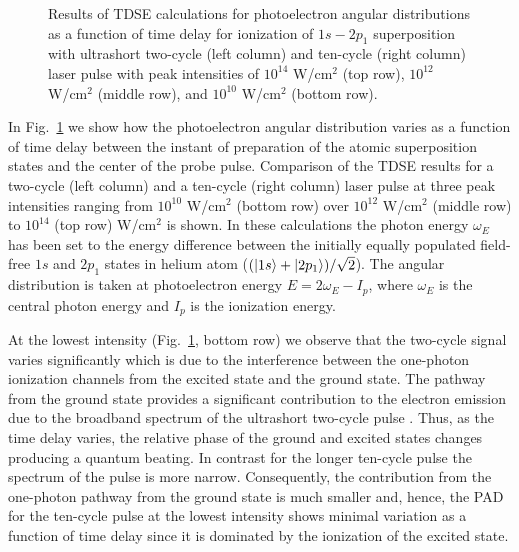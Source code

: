\begin{figure}[t]
\centering
\caption{
Results of TDSE calculations for photoelectron angular distributions as a function of time delay for ionization of $1s - 2p_1$ superposition with ultrashort two-cycle (left column) and ten-cycle (right column) laser pulse with peak intensities of $10^{14}$ W/cm$^2$ (top row), $10^{12}$ W/cm$^2$ (middle row), and $10^{10}$ W/cm$^2$ (bottom row).
} 
  \label{fig:pad_vs_time}
\end{figure}

In Fig.~\ref{fig:pad_vs_time} we show how the photoelectron angular distribution varies as a function of time delay between the instant of preparation of the atomic superposition states and the center of the probe pulse. Comparison of the TDSE results for a two-cycle (left column) and a ten-cycle (right column) laser pulse at three peak intensities ranging from $10^{10}$ W/cm$^2$ (bottom row) over $10^{12}$ W/cm$^2$ (middle row) to $10^{14}$ (top row) W/cm$^2$ is shown. In these calculations the photon energy $\omega_E$ has been set to the energy difference between the initially equally populated field-free $1s$ and $2p_1$ states in helium atom ($(\ket{1s}+\ket{2p_1})/\sqrt{2}$). The angular distribution is taken at photoelectron energy $E = 2\omega_E - I_p$, where $\omega_E$ is the central photon energy and $I_p$ is the ionization energy.

At the lowest intensity (Fig.~\ref{fig:pad_vs_time}, bottom row) we observe that the two-cycle signal varies significantly which is due to the interference between the one-photon ionization channels from the excited state and the ground state. The pathway from the ground state provides a significant contribution to the electron emission due to the broadband spectrum of the ultrashort two-cycle pulse \cite{venzke2020_ionization,venzke2020_GAP}. Thus, as the time delay varies, the relative phase of the ground and excited states changes producing a quantum beating. In contrast for the longer ten-cycle pulse the spectrum of the pulse is more narrow. Consequently, the contribution from the one-photon pathway from the ground state is much smaller and, hence, the PAD for the ten-cycle pulse at the lowest intensity shows minimal variation as a function of time delay since it is dominated by the ionization of the excited state. 

